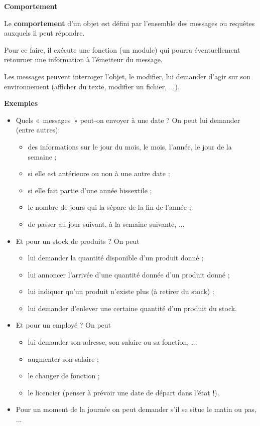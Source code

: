 {\sffamily\bfseries\upshape
Comportement}

{
Le \textbf{comportement} d'un objet est défini par
l'ensemble des messages ou requêtes auxquels il peut
répondre.}

{
Pour ce faire, il exécute une fonction (un module) qui pourra
éventuellement retourner une information à l'émetteur
du message.}

{
Les messages peuvent interroger l'objet, le modifier,
lui demander d'agir sur son environnement (afficher du
texte, modifier un fichier, ...). }

{
\textbf{Exemples} }

\liststyleListv
\begin{itemize}
\item {
Quels «~messages~» peut-on envoyer à une date ? On peut lui demander
(entre autres):}
	\begin{itemize}
	\item {
	des informations sur le jour du mois, le mois, l'année,
	le jour de la semaine ; }
	\item {
	si elle est antérieure ou non à une autre date ;}
	\item {
	si elle fait partie d'une année bissextile ; }
	\item {
	le nombre de jours qui la sépare de la fin de l'année
	;}
	\item {
	de passer au jour suivant, à la semaine suivante, ...}
	\end{itemize}
\item {
Et pour un stock de produits ? On peut }
	\begin{itemize}
	\item {
	lui demander la quantité disponible d'un produit donné
	;}
	\item {
	lui annoncer l'arrivée d'une quantité
	donnée d'un produit donné ;}
	\item {
	lui indiquer qu'un produit n'existe
	plus (à retirer du stock) ;}
	\item {
	lui demander d'enlever une certaine quantité
	d'un produit du stock.}
	\end{itemize}
\item {
Et pour un employé ? On peut}
	\begin{itemize}
	\item {
	lui demander son adresse, son salaire ou sa fonction, ...}
	\item {
	augmenter son salaire ;}
	\item {
	le changer de fonction ;}
	\item {
	le licencier (penser à prévoir une date de départ dans
	l'état !).}
	\end{itemize}
\item {
Pour un moment de la journée on peut demander s'il se
situe le matin ou pas, ...}	
\end{itemize}

